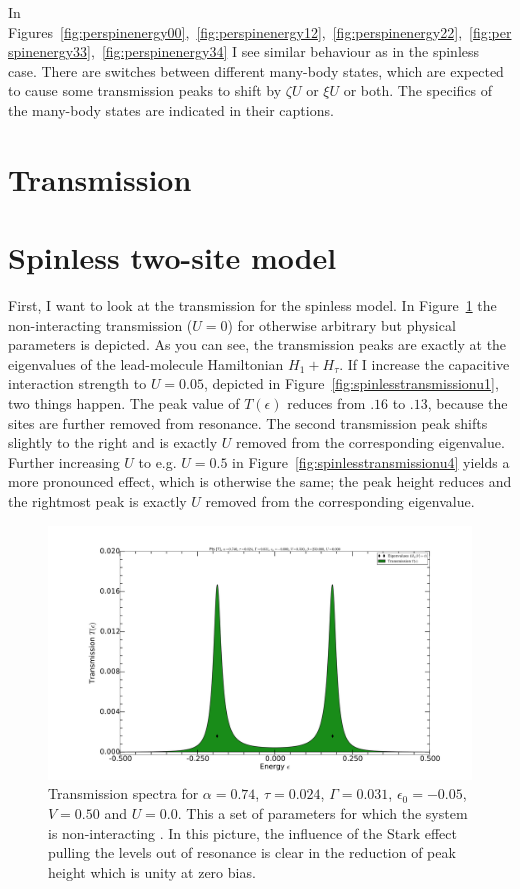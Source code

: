 In Figures~\ref{fig:perspinenergy00},~\ref{fig:perspinenergy12},~\ref{fig:perspinenergy22},~\ref{fig:perspinenergy33},~\ref{fig:perspinenergy34} I see similar behaviour as in the spinless case. There are switches between different many-body states, which are expected to cause some transmission peaks to shift by $\zeta U$ or $\xi U$ or both. The specifics of the many-body states are indicated in their captions.

\section{Transmission}
\label{sec:twositetransmission}
\section{Spinless two-site model}
First, I want to look at the transmission for the spinless model. In Figure~\ref{fig:spinlesstransmissionu0} the non\hyp{}interacting transmission ($U=0$) for otherwise arbitrary but physical parameters is depicted. As you can see, the transmission peaks are exactly at the eigenvalues of the lead-molecule Hamiltonian $H_1 + H_\tau$. If I increase the capacitive interaction strength to $U=0.05$, depicted in Figure~\ref{fig:spinlesstransmissionu1}, two things happen. The peak value of $T(\epsilon)$ reduces from $.16$ to $.13$, because the sites are further removed from resonance. The second transmission peak shifts slightly to the right and is exactly $U$ removed from the corresponding eigenvalue. Further increasing $U$ to e.g. $U=0.5$ in Figure~\ref{fig:spinlesstransmissionu4} yields a more pronounced effect, which is otherwise the same; the peak height reduces and the rightmost peak is exactly $U$ removed from the corresponding eigenvalue.
\begin{figure}[!bt]
    \centering
    \includegraphics[height=.35\textheight,clip=true,trim=7cm 2cm 7cm 4cm]{pdf/trans/decospinlesstransmissionarbitraryu0.pdf}
    \caption{Transmission spectra for $\alpha=0.74$, $\tau=0.024$, $\Gamma=0.031$, $\epsilon_0 = - 0.05$, $V=0.50$ and $U=0.0$. This a set of parameters for which the system is non\hyp{}interacting . In this picture, the influence of the Stark effect pulling the levels out of resonance is clear in the reduction of peak height which is unity at zero bias.}
    \label{fig:spinlesstransmissionu0}
\end{figure}
